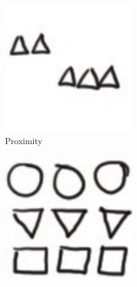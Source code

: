 \begin{figure}
\centering
  \begin{subfigure}[b]{28mm} 
    \includegraphics[width=\textwidth]{img/gestalt-proximity.pdf} 
    \caption{Proximity}
    \label{fig:gestalt-proximity}
  \end{subfigure}
  \hspace{2mm}
  \begin{subfigure}[b]{28mm} 
    \includegraphics[width=\textwidth]{img/gestalt-similarity.pdf} 

\end{subfigure}
\end{figure}
